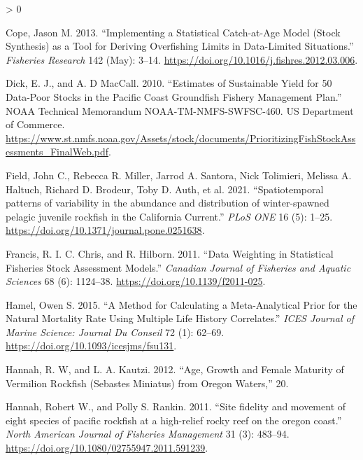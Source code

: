 \documentclass[11pt,
  english,
  a4paper,
]{article}
\newlength{\cslhangindent}
\newenvironment{CSLReferences}[2] %
 {%
  \setlength{\parindent}{0pt}
  \ifodd #1 \everypar{\setlength{\hangindent}{\cslhangindent}}\ignorespaces\fi
  \ifnum #2 > 0
  \setlength{\parskip}{#2\baselineskip}
  \fi
 }%
 {}
\begin{document}
\hypertarget{refs}{}
\begin{CSLReferences}{1}{0}
\leavevmode\hypertarget{ref-cope_implementing_2013}{}%
Cope, Jason M. 2013. {``Implementing a Statistical Catch-at-Age Model (Stock Synthesis) as a Tool for Deriving Overfishing Limits in Data-Limited Situations.''} \emph{Fisheries Research} 142 (May): 3--14. \url{https://doi.org/10.1016/j.fishres.2012.03.006}.

\leavevmode\hypertarget{ref-dick_estimates_2010}{}%
Dick, E. J., and A. D MacCall. 2010. {``Estimates of Sustainable Yield for 50 Data-Poor Stocks in the Pacific Coast Groundfish Fishery Management Plan.''} NOAA Technical Memorandum NOAA-TM-NMFS-SWFSC-460. US Department of Commerce. \url{https://www.st.nmfs.noaa.gov/Assets/stock/documents/PrioritizingFishStockAssessments_FinalWeb.pdf}.

\leavevmode\hypertarget{ref-Field2021}{}%
Field, John C., Rebecca R. Miller, Jarrod A. Santora, Nick Tolimieri, Melissa A. Haltuch, Richard D. Brodeur, Toby D. Auth, et al. 2021. {``{Spatiotemporal patterns of variability in the abundance and distribution of winter-spawned pelagic juvenile rockfish in the California Current}.''} \emph{PLoS ONE} 16 (5): 1--25. \url{https://doi.org/10.1371/journal.pone.0251638}.

\leavevmode\hypertarget{ref-francis_data_2011}{}%
Francis, R. I. C. Chris, and R. Hilborn. 2011. {``Data Weighting in Statistical Fisheries Stock Assessment Models.''} \emph{Canadian Journal of Fisheries and Aquatic Sciences} 68 (6): 1124--38. \url{https://doi.org/10.1139/f2011-025}.

\leavevmode\hypertarget{ref-hamel_method_2015}{}%
Hamel, Owen S. 2015. {``A Method for Calculating a Meta-Analytical Prior for the Natural Mortality Rate Using Multiple Life History Correlates.''} \emph{ICES Journal of Marine Science: Journal Du Conseil} 72 (1): 62--69. \url{https://doi.org/10.1093/icesjms/fsu131}.

\leavevmode\hypertarget{ref-hannah_age_2012}{}%
Hannah, R. W, and L. A. Kautzi. 2012. {``Age, Growth and Female Maturity of Vermilion Rockfish (Sebastes Miniatus) from Oregon Waters,''} 20.

\leavevmode\hypertarget{ref-Hannah2011}{}%
Hannah, Robert W., and Polly S. Rankin. 2011. {``{Site fidelity and movement of eight species of pacific rockfish at a high-relief rocky reef on the oregon coast}.''} \emph{North American Journal of Fisheries Management} 31 (3): 483--94. \url{https://doi.org/10.1080/02755947.2011.591239}.


\end{CSLReferences}
\end{document}
